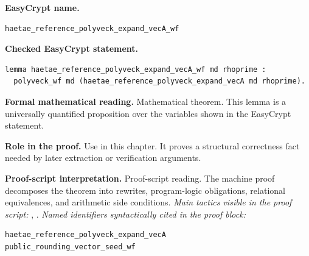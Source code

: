 \begin{formaltheorem}
\noindent\textbf{EasyCrypt name.}
\begin{lstlisting}[language=EasyCrypt,basicstyle=\ttfamily\scriptsize]
haetae_reference_polyveck_expand_vecA_wf
\end{lstlisting}
\noindent\textbf{Checked EasyCrypt statement.}
\begin{lstlisting}[language=EasyCrypt,basicstyle=\ttfamily\scriptsize]
lemma haetae_reference_polyveck_expand_vecA_wf md rhoprime :
  polyveck_wf md (haetae_reference_polyveck_expand_vecA md rhoprime).
\end{lstlisting}
\noindent\textbf{Formal mathematical reading.}
Mathematical theorem. This lemma is a universally quantified proposition over the variables shown in the EasyCrypt statement.

\noindent\textbf{Role in the proof.}
Use in this chapter. It proves a structural correctness fact needed by later extraction or verification arguments.

\noindent\textbf{Proof-script interpretation.}
Proof-script reading. The machine proof decomposes the theorem into rewrites, program-logic obligations, relational equivalences, and arithmetic side conditions.
\emph{Main tactics visible in the proof script:} , .
\emph{Named identifiers syntactically cited in the proof block:}
\begin{lstlisting}[language=EasyCrypt,basicstyle=\ttfamily\scriptsize]
haetae_reference_polyveck_expand_vecA
public_rounding_vector_seed_wf
\end{lstlisting}

\end{formaltheorem}

